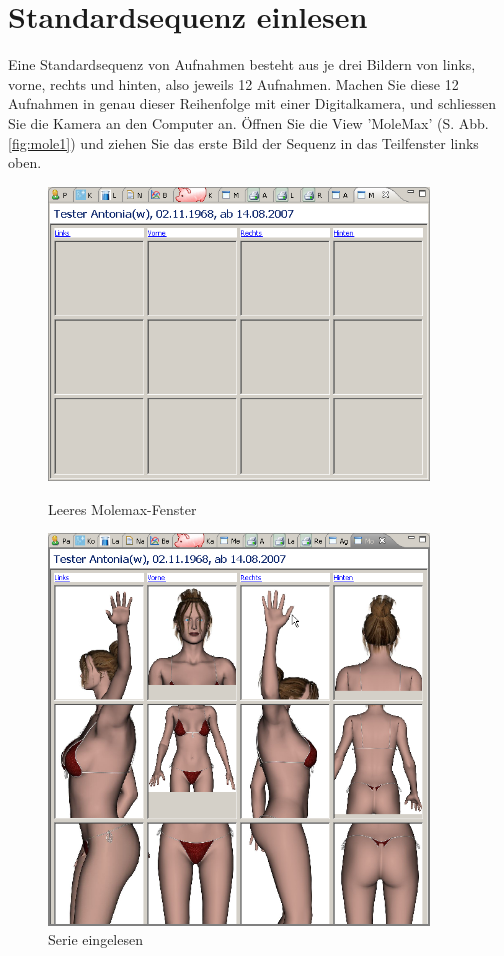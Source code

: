 \documentclass[a4paper]{scrartcl}
\begin{document}
\section{Standardsequenz einlesen}
Eine Standardsequenz von Aufnahmen besteht aus je drei Bildern von links, vorne, rechts und hinten, also jeweils 12 Aufnahmen. Machen Sie diese 12 Aufnahmen in genau dieser Reihenfolge mit einer Digitalkamera, und schliessen Sie die Kamera an den Computer an. Öffnen Sie die View 'MoleMax' (S. Abb. \ref{fig:mole1}) und ziehen Sie das erste Bild der Sequenz in das Teilfenster links oben.
\begin{figure}[htp]
    \begin{minipage}{0.45\textwidth}
        \centering
         \includegraphics[width=0.9\textwidth]{molemax1}
         \hfill
         \caption{Leeres Molemax-Fenster}
         \label{fig:mole1}
     \end{minipage}
    \hfill
    \begin{minipage}{0.45\textwidth}
        \centering
         \includegraphics[width=0.9\textwidth]{molemax2}
         \caption{Serie eingelesen}
         \label{fig:mole2}
     \end{minipage}
\end{figure}
\end{document}
